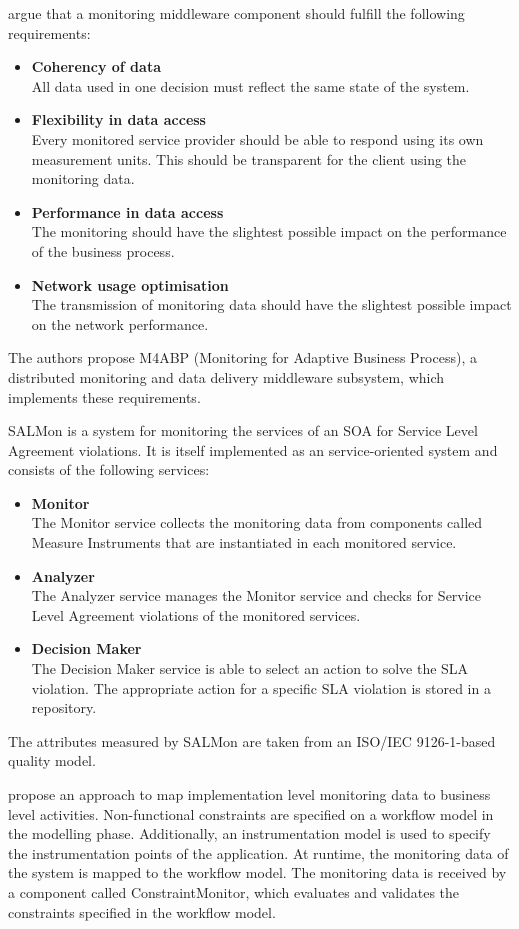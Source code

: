\citet{Duc:2009kx} argue that a monitoring middleware component should fulfill the following requirements:
\begin{itemize}
	\item \textbf{Coherency of data}\\
	All data used in one decision must reflect the same state of the system.
	\item \textbf{Flexibility in data access}\\
	Every monitored service provider should be able to respond using its own measurement units. This should be transparent for the client using the monitoring data.
	\item \textbf{Performance in data access}\\
	The monitoring should have the slightest possible impact on the performance of the business process.
	\item \textbf{Network usage optimisation}\\
	The transmission of monitoring data should have the slightest possible impact on the network performance.
\end{itemize}
The authors propose M4ABP (Monitoring for Adaptive Business Process), a distributed monitoring and data delivery middleware subsystem, which implements these requirements.

SALMon \citep{Ameller:2008zr} is a system for monitoring the services of an SOA for Service Level Agreement violations. It is itself implemented as an service-oriented system and consists of the following services:
\begin{itemize}
	\item \textbf{Monitor}\\
	The Monitor service collects the monitoring data from components called Measure Instruments that are instantiated in each monitored service. 
	\item \textbf{Analyzer}\\
	The Analyzer service manages the Monitor service and checks for Service Level Agreement violations of the monitored services.
	\item \textbf{Decision Maker}\\
	The Decision Maker service is able to select an action to solve the SLA violation. The appropriate action for a specific SLA violation is stored in a repository.
\end{itemize}
The attributes measured by SALMon are taken from an ISO/IEC 9126-1-based quality model.

\citet{Textor:2009vn} propose an approach to map implementation level monitoring data to business level activities. Non-functional constraints are specified on a workflow model in the modelling phase. Additionally, an instrumentation model is used to specify the instrumentation points of the application. At runtime, the monitoring data of the system is mapped to the workflow model. 
The monitoring data is received by a component called ConstraintMonitor, which evaluates and validates the constraints specified in the workflow model.

